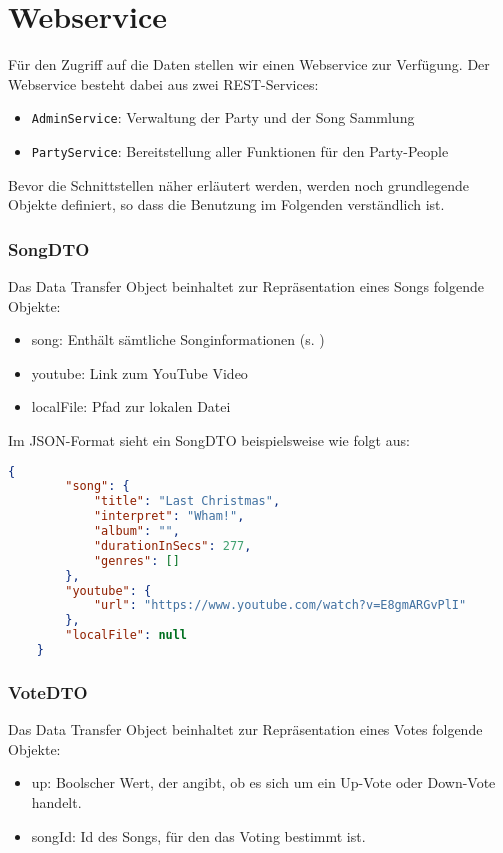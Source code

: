 \section{Webservice}
\label{cha:Webservice}
Für den Zugriff auf die Daten stellen wir einen Webservice zur Verfügung.
Der Webservice besteht dabei aus zwei REST-Services:
\begin{itemize}
\item \texttt{AdminService}: Verwaltung der Party und der Song Sammlung
\item \texttt{PartyService}: Bereitstellung aller Funktionen für den Party-People
\end{itemize}

Bevor die Schnittstellen näher erläutert werden, werden noch grundlegende Objekte definiert, so dass die Benutzung im Folgenden verständlich ist.

\subsubsection{SongDTO}
\label{object:SongDTO}
Das Data Transfer Object beinhaltet zur Repräsentation eines Songs folgende Objekte:
\begin{itemize}
\item{song: Enthält sämtliche Songinformationen (s. )}
\item{youtube: Link zum YouTube Video}
\item{localFile: Pfad zur lokalen Datei}
\end{itemize}

Im JSON-Format sieht ein SongDTO beispielsweise wie folgt aus:

\begin{lstlisting}[language=json]
    {
        "song": {
            "title": "Last Christmas",
            "interpret": "Wham!",
            "album": "",
            "durationInSecs": 277,
            "genres": []
        },
        "youtube": {
            "url": "https://www.youtube.com/watch?v=E8gmARGvPlI"
        },
        "localFile": null
    }
\end{lstlisting}

\subsubsection{VoteDTO}
\label{object:VoteDTO}
Das Data Transfer Object beinhaltet zur Repräsentation eines Votes folgende Objekte:
\begin{itemize}
\item{up: Boolscher Wert, der angibt, ob es sich um ein Up-Vote oder Down-Vote handelt.}
\item{songId: Id des Songs, für den das Voting bestimmt ist.}
\end{itemize}

